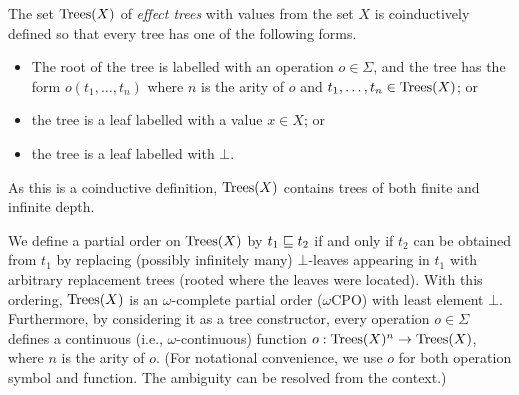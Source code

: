 \begin{definition}
The set $\textnormal{Trees}(X)$ of \emph{effect trees} with values from  the set $X$ is coinductively defined so that
every tree has one of the following  forms.
\begin{itemize}
\item The root of the tree is labelled with an operation $o \in \Sigma$, and the tree has the form
         $o(t_1, \dots, t_n)$ where $n$ is the arity of $o$ and $t_1, \dots, t_n \in \textnormal{Trees}(X)$; or
\item the tree is a leaf labelled with a value $x \in X$; or
\item the tree is a leaf labelled with $\bot$.
\end{itemize}
\end{definition}
As this is a coinductive definition, $\textnormal{Trees}(X)$ contains trees of both finite and infinite depth.

We define a partial order on  $\textnormal{Trees}(X)$ by
$t_1 \sqsubseteq t_2$ if and only if $t_2$ can be obtained from $t_1$ by replacing (possibly infinitely many)
$\bot$-leaves appearing in $t_1$ with arbitrary replacement trees (rooted where the leaves were located). With this ordering,  $\textnormal{Trees}(X)$  is an $\omega$-complete 
partial order ($\omega$CPO) with least element $\bot$. Furthermore, by considering it as
a tree constructor,
every operation $o \in \Sigma$  defines a continuous (i.e., $\omega$-continuous) function $o : \textnormal{Trees}(X)^n \to \textnormal{Trees}(X)$, where $n$ is the arity of $o$.
(For notational convenience, we use $o$ for both operation symbol and function. The ambiguity can be resolved from the context.) 

